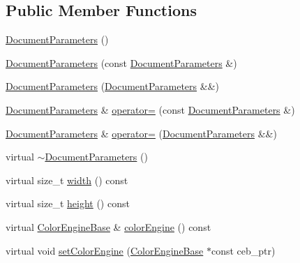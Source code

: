 \subsection*{Public Member Functions}
\begin{DoxyCompactItemize}
\item 
\hyperlink{classGraphicalEditorCore_1_1DocumentParameters_a89df3a7acba401ec3c636d599d40341f}{Document\+Parameters} ()
\item 
\hyperlink{classGraphicalEditorCore_1_1DocumentParameters_ad34fb74cda0ad52bc38678875ce32c91}{Document\+Parameters} (const \hyperlink{classGraphicalEditorCore_1_1DocumentParameters}{Document\+Parameters} \&)
\item 
\hyperlink{classGraphicalEditorCore_1_1DocumentParameters_af797b5c95963fdafdd2253bb4d152c21}{Document\+Parameters} (\hyperlink{classGraphicalEditorCore_1_1DocumentParameters}{Document\+Parameters} \&\&)
\item 
\hyperlink{classGraphicalEditorCore_1_1DocumentParameters}{Document\+Parameters} \& \hyperlink{classGraphicalEditorCore_1_1DocumentParameters_a084ca6d2aafc7e65b401b2e62b0a16e4}{operator=} (const \hyperlink{classGraphicalEditorCore_1_1DocumentParameters}{Document\+Parameters} \&)
\item 
\hyperlink{classGraphicalEditorCore_1_1DocumentParameters}{Document\+Parameters} \& \hyperlink{classGraphicalEditorCore_1_1DocumentParameters_a947b1cc43448286d07300fd7b9eeb722}{operator=} (\hyperlink{classGraphicalEditorCore_1_1DocumentParameters}{Document\+Parameters} \&\&)
\item 
virtual \hyperlink{classGraphicalEditorCore_1_1DocumentParameters_a4ea3a0d935da5c124d9989fd686d6d70}{$\sim$\+Document\+Parameters} ()
\item 
virtual size\+\_\+t \hyperlink{classGraphicalEditorCore_1_1DocumentParameters_af84100459d1e49474e57e5b7b16f1750}{width} () const 
\item 
virtual size\+\_\+t \hyperlink{classGraphicalEditorCore_1_1DocumentParameters_ab28b51581bade5d1b1a4122b347995da}{height} () const 
\item 
virtual \hyperlink{classGraphicalEditorCore_1_1ColorEngineBase}{Color\+Engine\+Base} \& \hyperlink{classGraphicalEditorCore_1_1DocumentParameters_a7be5fa9d87e97bbc523f976d4acdd657}{color\+Engine} () const 
\item 
virtual void \hyperlink{classGraphicalEditorCore_1_1DocumentParameters_a57c2ba4a8cfc9c4a058f109a1c32f4aa}{set\+Color\+Engine} (\hyperlink{classGraphicalEditorCore_1_1ColorEngineBase}{Color\+Engine\+Base} $\ast$const ceb\+\_\+ptr)
\end{DoxyCompactItemize}


